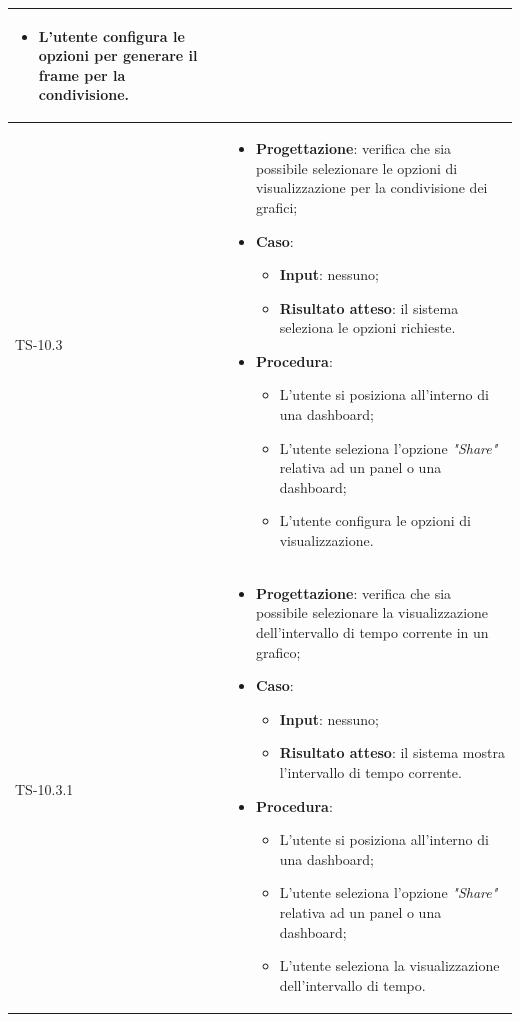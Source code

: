 \begin{longtable}{|C{2.5cm}|C{13cm}|}
\begin{itemize}
\begin{itemize}
		\item L'utente configura le opzioni per generare il frame per la condivisione.
	\end{itemize} 
\end{itemize}
	  \\
	\hline
	{TS-10.3} &
\begin{itemize}
	\item \textbf{Progettazione}: verifica che sia possibile selezionare le
	opzioni di visualizzazione per la condivisione dei grafici;
	\item \textbf{Caso}: 
	\begin{itemize}
		\item \textbf{Input}: nessuno;
		\item \textbf{Risultato atteso}: il sistema seleziona le opzioni richieste.
	\end{itemize}
	\item \textbf{Procedura}:
	\begin{itemize}
		\item L'utente si posiziona all'interno di una dashboard;
		\item L'utente seleziona l'opzione \emph{"Share"} relativa ad un panel o una dashboard;
		\item L'utente configura le opzioni di visualizzazione.
	\end{itemize} 
\end{itemize}
	\\
	\hline
	{TS-10.3.1} &
\begin{itemize}
	\item \textbf{Progettazione}: verifica che sia  possibile selezionare la
	visualizzazione dell'intervallo di tempo corrente in un grafico;
	\item \textbf{Caso}: 
	\begin{itemize}
		\item \textbf{Input}: nessuno;
		\item \textbf{Risultato atteso}: il sistema mostra l'intervallo di tempo corrente.
	\end{itemize}
	\item \textbf{Procedura}:
	\begin{itemize}
		\item L'utente si posiziona all'interno di una dashboard;
		\item L'utente seleziona l'opzione \emph{"Share"} relativa ad un panel o una dashboard;
		\item L'utente seleziona la visualizzazione dell'intervallo di tempo.
	\end{itemize} 

\end{itemize}
\end{longtable}
